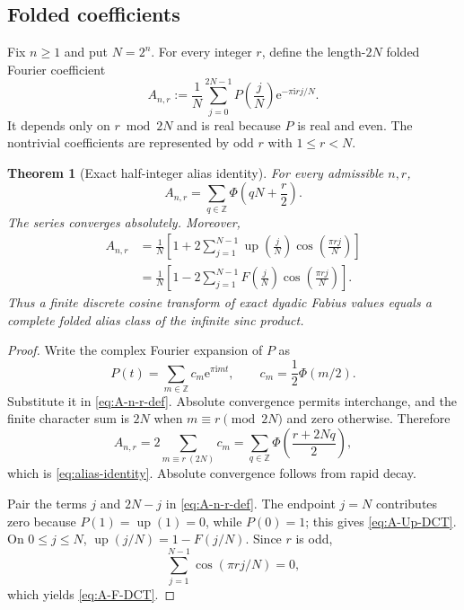 \documentclass[11pt,oneside]{article}
\newtheorem{theorem}{Theorem}[section]
\theoremstyle{definition}
\theoremstyle{remark}
\newcommand{\Z}{\mathbb Z}
\newcommand{\Up}{\operatorname{up}}
\newcommand{\e}{\mathrm e}
\newcommand{\ii}{\mathrm i}
\newcommand{\PhiU}{\Phi}
\begin{document}
\subsection{Folded coefficients}

Fix $n\ge1$ and put $N=2^n$.  For every integer $r$, define the
length-$2N$ folded Fourier coefficient
\begin{equation}\label{eq:A-n-r-def}
 A_{n,r}:=\frac1N\sum_{j=0}^{2N-1}
 P\!\left(\frac jN\right)\e^{-\pi\ii rj/N}.
\end{equation}
It depends only on $r\bmod 2N$ and is real because $P$ is real and even.  The
nontrivial coefficients are represented by odd $r$ with $1\le r<N$.

\begin{theorem}[Exact half-integer alias identity]\label{thm:alias-identity}
For every admissible $n,r$,
\begin{equation}\label{eq:alias-identity}
 \boxed{
 A_{n,r}=\sum_{q\in\Z}\PhiU\!\left(qN+\frac r2\right).}
\end{equation}
The series converges absolutely.  Moreover,
\begin{align}
 A_{n,r}
 &=\frac1N\left[1+2\sum_{j=1}^{N-1}
 \Up\!\left(\frac jN\right)
 \cos\!\left(\frac{\pi rj}{N}\right)\right]
 \label{eq:A-Up-DCT}\\
 &=\frac1N\left[1-2\sum_{j=1}^{N-1}
 F\!\left(\frac jN\right)
 \cos\!\left(\frac{\pi rj}{N}\right)\right].
 \label{eq:A-F-DCT}
\end{align}
Thus a finite discrete cosine transform of exact dyadic Fabius values equals a
complete folded alias class of the infinite sinc product.
\end{theorem}

\begin{proof}
Write the complex Fourier expansion of $P$ as
\[
 P(t)=\sum_{m\in\Z}c_m\e^{\pi\ii mt},
 \qquad c_m=\frac12\PhiU(m/2).
\]
Substitute it in \eqref{eq:A-n-r-def}.  Absolute convergence permits
interchange, and the finite character sum is $2N$ when $m\equiv r\pmod{2N}$
and zero otherwise.  Therefore
\[
 A_{n,r}=2\sum_{m\equiv r\ (2N)}c_m
 =\sum_{q\in\Z}\PhiU\!\left(\frac{r+2Nq}{2}\right),
\]
which is \eqref{eq:alias-identity}.  Absolute convergence follows from rapid
decay.

Pair the terms $j$ and $2N-j$ in \eqref{eq:A-n-r-def}.  The endpoint
$j=N$ contributes zero because $P(1)=\Up(1)=0$, while $P(0)=1$; this gives
\eqref{eq:A-Up-DCT}.  On $0\le j\le N$,
$\Up(j/N)=1-F(j/N)$.  Since $r$ is odd,
\[
 \sum_{j=1}^{N-1}\cos(\pi rj/N)=0,
\]
which yields \eqref{eq:A-F-DCT}.
\end{proof}
\end{document}
